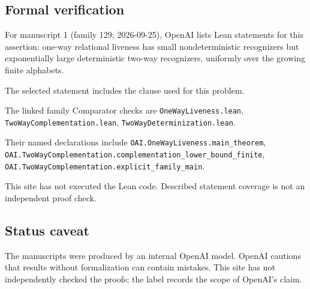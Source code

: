 \documentclass[11pt]{article}
\begin{document}
\subsection{Formal verification}
For manuscript 1 (family 129; 2026-09-25), OpenAI lists Lean statements for this assertion: one-way relational liveness has small nondeterministic recognizers but exponentially large deterministic two-way recognizers, uniformly over the growing finite alphabets.

The selected statement includes the clause used for this problem.

The linked family Comparator checks are \texttt{OneWayLiveness.lean}, \texttt{TwoWayComplementation.lean}, \texttt{TwoWayDeterminization.lean}.

Their named declarations include \texttt{OAI.OneWayLiveness.main\_theorem}, \texttt{OAI.TwoWayComplementation.complementation\_lower\_bound\_finite}, \texttt{OAI.TwoWayComplementation.explicit\_family\_main}.

This site has not executed the Lean code. Described statement coverage is not an independent proof check.

\subsection{Status caveat}
The manuscripts were produced by an internal OpenAI model. OpenAI cautions that results without formalization can contain mistakes. This site has not independently checked the proofs; the label records the scope of OpenAI's claim.
\end{document}
